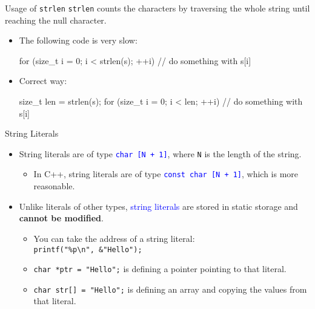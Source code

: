 \documentclass[handout]{beamer}
\newcommand{\blue}[1]{\textcolor{blue}{#1}}
\newcommand{\ttt}[1]{\texttt{#1}}
\newcommand{\bluett}[1]{\blue{\ttt{#1}}}
\theoremstyle{definition}
\begin{document}
\begin{frame}[fragile]{Usage of \ttt{strlen}}
    \ttt{strlen} counts the characters by traversing the whole string until reaching the null character.
    \begin{itemize}
        \item The following code is very slow:
        \begin{cpp}
for (size_t i = 0; i < strlen(s); ++i)
  // do something with s[i]
        \end{cpp}
        \pause
        \item Correct way:
        \begin{cpp}
size_t len = strlen(s);
for (size_t i = 0; i < len; ++i)
  // do something with s[i]
        \end{cpp}
    \end{itemize}
\end{frame}

\begin{frame}{String Literals}
    \begin{itemize}
        \item String literals are of type \bluett{char [N + 1]}, where \ttt{N} is the length of the string.
        \begin{itemize}
            \item In C++, string literals are of type \bluett{const char [N + 1]}, which is more reasonable.
        \end{itemize}
        \pause
        \item Unlike literals of other types, \blue{string literals} are stored in static storage and \textbf{cannot be modified}.
        \begin{itemize}
            \item You can take the address of a string literal:\\
            \ttt{printf("\%p\textbackslash n", \&"Hello");}
            \pause
            \item \ttt{char *ptr = "Hello";} is defining a pointer pointing to that literal.
            \item \ttt{char str[] = "Hello";} is defining an array and copying the values from that literal.
        \end{itemize}
    \end{itemize}
\end{frame}
\end{document}

